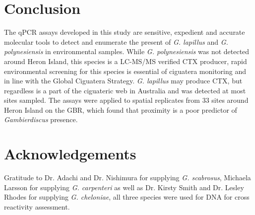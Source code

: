\documentclass[12pt]{article}
\begin{document}
\section*{Conclusion}
The qPCR assays developed in this study are sensitive, expedient and accurate molecular tools to detect and enumerate the present of \emph{G. lapillus} and \emph{G. polynesiensis} in environmental samples.
While \emph{G. polynesiensis} was not detected around Heron Island, this species is a LC-MS/MS verified CTX producer, rapid environmental screening for this species is essential of ciguatera monitoring and in line with the Global Ciguatera Strategy. \emph{G. lapillus} may produce CTX, but regardless is a part of the ciguateric web in Australia and was detected at most sites sampled.
The assays were applied to spatial replicates from 33 sites around Heron Island on the GBR, which found that proximity is a poor predictor of \textit{Gambierdiscus} presence.
 \section*{Acknowledgements}
Gratitude to Dr. Adachi and Dr. Nishimura for supplying \emph{G. scabrosus}, Michaela Larsson for supplying \emph{G. carpenteri} as well as Dr. Kirsty Smith and Dr. Lesley Rhodes for supplying \emph{G. cheloniae}, all three species were used for DNA for cross reactivity assessment. 
\FloatBarrier
\newpage


\newpage
\end{document}
